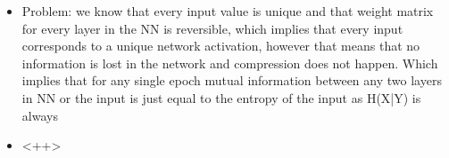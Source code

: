 \begin{itemize}
{\begin{itemize}
{            Where:

            \begin{itemize}
              \item{
                  $X$ - Input distribution
                }
              \item{
                  $Y$ - Output distribution
                }
              \item{
                  $T_i$ - Distribution of $i'th$ layer in the neural network
                }
            \end{itemize}

          }
        \item{
            Problem: we know that every input value is unique and that weight
            matrix for every layer in the NN is reversible, which implies that
            every input corresponds to a unique network activation, however that
            means that no information is lost in the network and compression
            does not happen. Which implies that for any single epoch mutual
            information between any two layers in NN or the input is just equal to the entropy of the input as H(X|Y) is always 

          }
        \item{
            <++>
          }
      \end{itemize}



}
\end{itemize}
